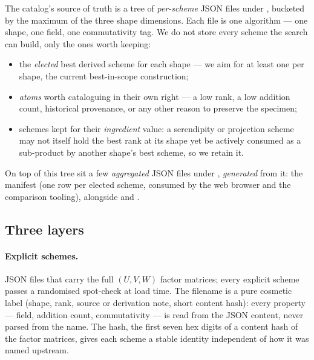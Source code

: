 
The catalog's source of truth is a tree of \emph{per-scheme} JSON files
under , bucketed by the
maximum of the three shape dimensions. Each file is one algorithm ---
one shape, one field, one commutativity tag. We do not store every
scheme the search can build, only the ones worth keeping:
\begin{itemize}[itemsep=2pt]
  \item the \emph{elected} best derived scheme for each shape --- we aim
    for at least one per shape, the current best-in-scope construction;
  \item \emph{atoms} worth cataloguing in their own right --- a low
    rank, a low addition count, historical provenance, or any other
    reason to preserve the specimen;
  \item schemes kept for their \emph{ingredient} value: a serendipity or
    projection scheme may not itself hold the best rank at its shape yet
    be actively consumed as a sub-product by another shape's best
    scheme, so we retain it.
\end{itemize}
On top of this tree sit a few \emph{aggregated} JSON files under
, \emph{generated} from it: the manifest
 (one row per elected scheme, consumed by the
web browser and the comparison tooling), alongside
 and
.

\subsection{Three layers}

\paragraph{Explicit schemes.} JSON files that carry the full \((U,
V, W)\) factor matrices; every explicit scheme passes a randomised
spot-check at load time. The filename is a pure cosmetic label
(shape, rank, source or derivation note, short content hash): every
property --- field, addition count, commutativity --- is read from
the JSON content, never parsed from the name. The hash, the first
seven hex digits of a content hash of the factor matrices, gives
each scheme a stable identity independent of how it was named
upstream.

